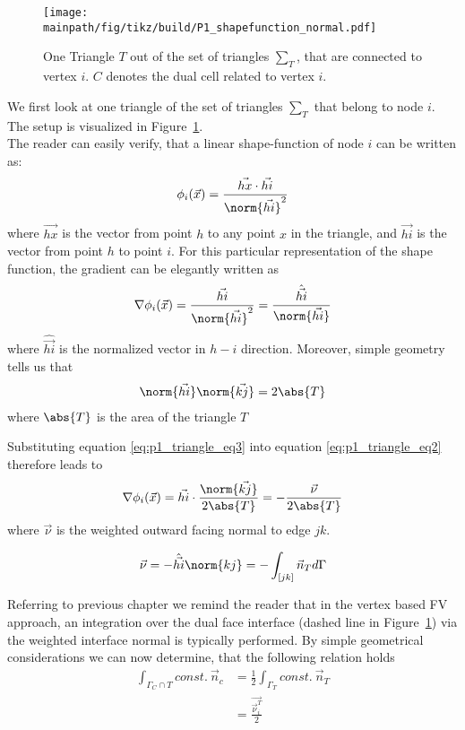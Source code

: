 \documentclass[../main.tex]{subfiles}
\begin{document}
\begin{figure}[h]
\centering
\texttt{[image: \\mainpath/fig/tikz/build/P1\_shapefunction\_normal.pdf]}
\caption[Geometric considerations on a primitive cell]{One Triangle $T$ out of the set of triangles $\sum_T$, that are connected to vertex $i$. $C$ denotes the dual cell related to vertex $i$.}
\label{fig:p1_linear_shape_function}
\end{figure}


We first look at one triangle of the set of triangles $\sum_T$ that belong to node $i$.\\
The setup is visualized in Figure~\ref{fig:p1_linear_shape_function}.\\
The reader can easily verify, that a linear shape-function of node $i$ can be written as:
\begin{align}\label{eq:p1_triangle_eq1}
  \phi_i(\vec{x})=\frac{\vec{hx}\cdot\vec{hi}}{\norm{\vec{hi}}^2}
\end{align}
where $\vec{hx}$ is the vector from point $h$ to any point $x$ in the triangle, and $\vec{hi}$ is the vector from point $h$ to point $i$.
For this particular representation of the shape function, the gradient can be elegantly written as
\begin{align}\label{eq:p1_triangle_eq2}
\nabla \phi_i(\vec{x})=\frac{\vec{hi}}{\norm{\vec{hi}}^2}=\frac{\hat{\vec{hi}}}{\norm{\vec{hi}}}
\end{align}
where $\hat{\vec{hi}}$ is the normalized vector in $h-i$ direction.
Moreover, simple geometry tells us that
\begin{align}\label{eq:p1_triangle_eq3}
\norm{\vec{hi}} \norm{\vec{kj}} = 2 \abs{T}
\end{align}
where $\abs{T}$ is the area of the triangle $T$

Substituting equation \ref{eq:p1_triangle_eq3} into equation \ref{eq:p1_triangle_eq2} therefore leads to
\begin{align}\label{eq:p1_triangle_eq4}
\nabla \phi_i(\vec{x})= \vec{hi}\cdot\frac{\norm{\vec{kj}}}{2\abs{T}}=-\frac{\vec{\nu}}{2\abs{T}}
\end{align}
where $\vec{\nu}$ is the weighted outward facing normal to edge $jk$.

\begin{align}
    \vec{\nu}=-\hat{\vec{hi}} \norm{kj} = -\int_{[jk]} \vec{n}_T d \Gamma
\end{align}

Referring to previous chapter we remind the reader that in the vertex based \ac{FV} approach, an integration over the dual face interface (dashed line in Figure~\ref{fig:p1_linear_shape_function}) via the weighted interface normal is typically performed.
By simple geometrical considerations we can now determine, that the following relation holds
\begin{align}\label{eq:final_relation}
\int_{\Gamma_C \cap T} const.~\vec{n}_c &= \frac{1}{2}\int_{\Gamma_T} const.~\vec{n}_T \\
                                        &= \frac{\vec{\vec{\nu}_i^T}}{2}
\end{align}
\end{document}
